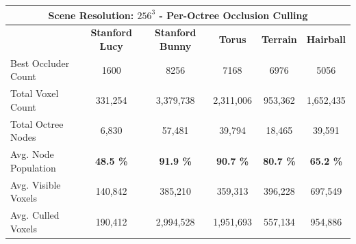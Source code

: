 \begin{table}[!htb]
  \begin{tabular}{|lccccc|}
    \hline
    \multicolumn{6}{|c|}{\textbf{Scene Resolution: $256^3$ - Per-Octree Occlusion Culling}}                                                                                                                                                                                         \\ \hline
    \multicolumn{1}{|l|}{}                          & \multicolumn{1}{|c|}{\textbf{Stanford Lucy}}  & \multicolumn{1}{c|}{\textbf{Stanford Bunny}}  & \multicolumn{1}{c|}{\textbf{Torus}}   & \multicolumn{1}{c|}{\textbf{Terrain}}     & \multicolumn{1}{c|}{\textbf{Hairball}}    \\ \hline
    \multicolumn{1}{|l|}{Best Occluder Count}       & \multicolumn{1}{c|}{1600}                     & \multicolumn{1}{c|}{8256}                     & \multicolumn{1}{c|}{7168}             & \multicolumn{1}{c|}{6976}                 & \multicolumn{1}{c|}{5056}                 \\ 
    \multicolumn{1}{|l|}{Total Voxel Count}         & \multicolumn{1}{c|}{331,254}                  & \multicolumn{1}{c|}{3,379,738}                & \multicolumn{1}{c|}{2,311,006}        & \multicolumn{1}{c|}{953,362}              & \multicolumn{1}{c|}{1,652,435}            \\
    \multicolumn{1}{|l|}{Total Octree Nodes}        & \multicolumn{1}{c|}{6,830}                    & \multicolumn{1}{c|}{57,481}                   & \multicolumn{1}{c|}{39,794}           & \multicolumn{1}{c|}{18,465}               & \multicolumn{1}{c|}{39,591}               \\
    \multicolumn{1}{|l|}{Avg. Node Population}      & \multicolumn{1}{c|}{\textbf{48.5 \%}}         & \multicolumn{1}{c|}{\textbf{91.9 \%}}         & \multicolumn{1}{c|}{\textbf{90.7 \%}} & \multicolumn{1}{c|}{\textbf{80.7 \%}}     & \multicolumn{1}{c|}{\textbf{65.2 \%}}     \\ \hline
    \multicolumn{1}{|l|}{Avg. Visible Voxels}       & \multicolumn{1}{c|}{140,842}                  & \multicolumn{1}{c|}{385,210}                  & \multicolumn{1}{c|}{359,313}          & \multicolumn{1}{c|}{396,228}              & \multicolumn{1}{c|}{697,549}              \\
    \multicolumn{1}{|l|}{Avg. Culled Voxels}        & \multicolumn{1}{c|}{190,412}                  & \multicolumn{1}{c|}{2,994,528}                & \multicolumn{1}{c|}{1,951,693}        & \multicolumn{1}{c|}{557,134}              & \multicolumn{1}{c|}{954,886}              \\

\end{tabular}
\end{table}
